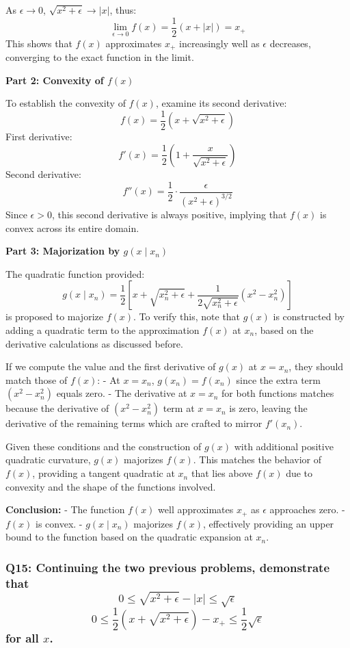 \documentclass[8pt]{article}
\begin{document}
As \(\epsilon \to 0\), \(\sqrt{x^2 + \epsilon} \to |x|\), thus:
\[ \lim_{\epsilon \to 0} f(x) = \frac{1}{2} (x + |x|) = x_+ \]
This shows that \( f(x) \) approximates \( x_+ \) increasingly well as \(\epsilon\) decreases, converging to the exact function in the limit.

\textbf{Part 2: Convexity of \( f(x) \)}

To establish the convexity of \( f(x) \), examine its second derivative:
\[ f(x) = \frac{1}{2} (x + \sqrt{x^2 + \epsilon}) \]
First derivative:
\[ f'(x) = \frac{1}{2} \left(1 + \frac{x}{\sqrt{x^2 + \epsilon}}\right) \]
Second derivative:
\[ f''(x) = \frac{1}{2} \cdot \frac{\epsilon}{(x^2 + \epsilon)^{3/2}} \]
Since \(\epsilon > 0\), this second derivative is always positive, implying that \( f(x) \) is convex across its entire domain.

\textbf{Part 3: Majorization by \( g(x \mid x_n) \)}

The quadratic function provided:
\[ g(x \mid x_n) = \frac{1}{2} \left[ x + \sqrt{x_n^2 + \epsilon} + \frac{1}{2\sqrt{x_n^2 + \epsilon}} (x^2 - x_n^2) \right] \]
is proposed to majorize \( f(x) \). To verify this, note that \( g(x) \) is constructed by adding a quadratic term to the approximation \( f(x) \) at \( x_n \), based on the derivative calculations as discussed before.

If we compute the value and the first derivative of \( g(x) \) at \( x = x_n \), they should match those of \( f(x) \):
- At \( x = x_n \), \( g(x_n) = f(x_n) \) since the extra term \( (x^2 - x_n^2) \) equals zero.
- The derivative at \( x = x_n \) for both functions matches because the derivative of \( (x^2 - x_n^2) \) term at \( x = x_n \) is zero, leaving the derivative of the remaining terms which are crafted to mirror \( f'(x_n) \).

Given these conditions and the construction of \( g(x) \) with additional positive quadratic curvature, \( g(x) \) majorizes \( f(x) \). This matches the behavior of \( f(x) \), providing a tangent quadratic at \( x_n \) that lies above \( f(x) \) due to convexity and the shape of the functions involved. 

\textbf{Conclusion:}
- The function \( f(x) \) well approximates \( x_+ \) as \(\epsilon\) approaches zero.
- \( f(x) \) is convex.
- \( g(x \mid x_n) \) majorizes \( f(x) \), effectively providing an upper bound to the function based on the quadratic expansion at \( x_n \).

\subsubsection*{Q15: Continuing the two previous problems, demonstrate that
\[
0 \leq \sqrt{x^2 + \epsilon} - |x| \leq \sqrt{\epsilon}
\]
\[
0 \leq \frac{1}{2} (x + \sqrt{x^2 + \epsilon}) - x_+ \leq \frac{1}{2} \sqrt{\epsilon}
\]
for all \( x \).}
\end{document}
